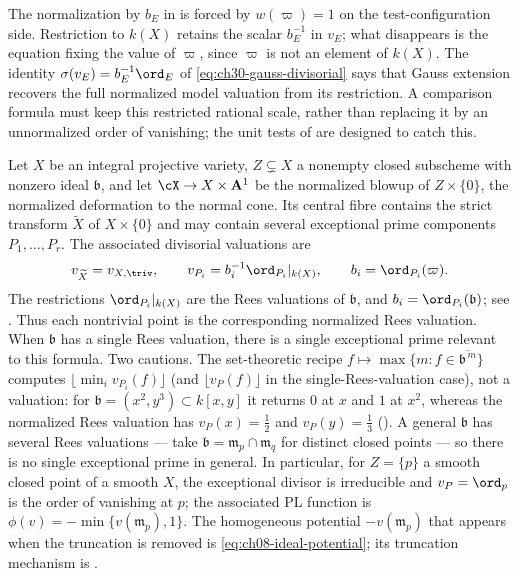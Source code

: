 \begin{remark}
\label{rem:ch32-bE}
The normalization by $b_E$ in  is forced
by $w(\varpi)=1$ on the test-configuration side.  Restriction to $k(X)$
retains the scalar $b_E^{-1}$ in $v_E$; what disappears is the equation
fixing the value of $\varpi$, since $\varpi$ is not an element of $k(X)$.  The identity
$\sigma(v_E)=b_E^{-1}\ord_E$ of \eqref{eq:ch30-gauss-divisorial} says that
Gauss extension recovers the full normalized model valuation from
its restriction.  A comparison formula must keep this restricted rational
scale, rather than replacing it by an unnormalized order of vanishing; the unit tests of
 are designed to catch this.
\end{remark}

\begin{example}
\label{ex:ch32-normal-cone-valuation}
Let $X$ be an integral projective variety, $Z\subsetneq X$ a nonempty
closed subscheme with nonzero ideal $\mathfrak b$, and let
$\cX\to X\times\mathbf A^1$ be the normalized
blowup of $Z\times\{0\}$, the normalized deformation to the normal cone.
Its central fibre contains the strict transform $\widetilde X$ of
$X\times\{0\}$ and may contain several exceptional prime components
$P_1,\ldots,P_r$.  The associated divisorial valuations are
\[
 v_{\widetilde X}=v_{X,\triv},
 \qquad
 v_{P_i}=b_i^{-1}\ord_{P_i}|_{k(X)},
 \qquad b_i=\ord_{P_i}(\varpi).
\]
The restrictions $\ord_{P_i}|_{k(X)}$ are the Rees valuations of
$\mathfrak b$, and $b_i=\ord_{P_i}(\mathfrak b)$; see
.  Thus each nontrivial point is the
corresponding normalized Rees valuation.  When $\mathfrak b$ has a single
Rees valuation, there is a single exceptional prime relevant to this
formula.
Two cautions.  The set-theoretic recipe
$f\mapsto\max\{m:f\in\overline{\mathfrak b^{\,m}}\}$ computes
$\lfloor\min_i v_{P_i}(f)\rfloor$ (and $\lfloor v_P(f)\rfloor$ in the
single-Rees-valuation case), not a valuation:
for $\mathfrak b=(x^2,y^3)\subset k[x,y]$ it returns $0$ at $x$ and
$1$ at $x^2$, whereas the normalized Rees valuation has
$v_P(x)=\tfrac12$ and $v_P(y)=\tfrac13$
().  A general
$\mathfrak b$ has several Rees valuations --- take
$\mathfrak b=\mathfrak m_p\cap\mathfrak m_q$ for distinct closed points
--- so there is no single exceptional prime in general.  In particular,
for $Z=\{p\}$ a smooth closed point of a smooth $X$, the exceptional
divisor is irreducible and $v_P=\ord_p$ is the order of vanishing at $p$;
the associated PL function is
$\phi(v)=-\min\{v(\mathfrak m_p),1\}$.  The homogeneous potential
$-v(\mathfrak m_p)$ that appears when the truncation is removed is
\eqref{eq:ch08-ideal-potential}; its truncation mechanism is
.
\end{example}

